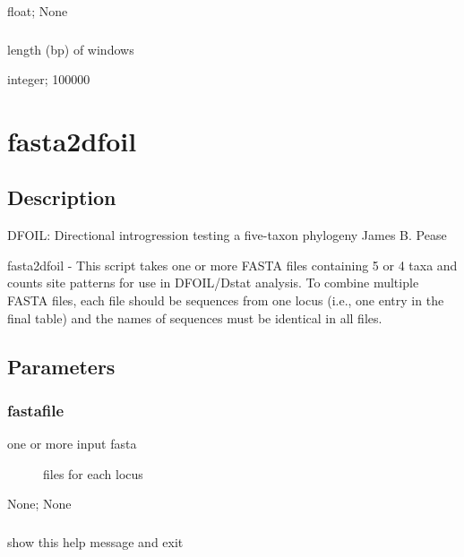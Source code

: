 \documentclass[letterpaper,12pt,english]{sphinxmanual}
\begin{document}
 float;  None


\subsubsection{}
\label{\detokenize{prog_desc:window}}
 length (bp) of windows

 integer;  100000


\section{fasta2dfoil}
\label{\detokenize{prog_desc:fasta2dfoil}}

\subsection{Description}
\label{\detokenize{prog_desc:id4}}
DFOIL: Directional introgression testing a five-taxon phylogeny
James B. Pease

fasta2dfoil -
This script takes one or more FASTA files containing
5 or 4 taxa and counts site patterns for use in DFOIL/Dstat analysis.
To combine multiple FASTA files, each file should be sequences
from one locus (i.e., one entry in the final table) and
the names of sequences must be identical in all files.


\subsection{Parameters}
\label{\detokenize{prog_desc:id5}}

\subsubsection{fastafile}
\label{\detokenize{prog_desc:fastafile}}\begin{description}
\item[{ one or more input fasta}] \leavevmode
files for each locus

\end{description}

 None;  None


\subsubsection{}
\label{\detokenize{prog_desc:id6}}
 show this help message and exit
\end{document}

